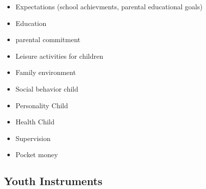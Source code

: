 \documentclass[letterpaper,10pt,openany,onesideH,english]{sphinxmanual}
\begin{document}
\begin{itemize}
\item {} 
Expectations (school achievments, parental educational goals)

\item {} 
Education

\item {} 
parental commitment

\item {} 
Leisure activities for children

\item {} 
Family environment

\item {} 
Social behavior child

\item {} 
Personality Child

\item {} 
Health Child

\item {} 
Supervision

\item {} 
Pocket money

\end{itemize}


\subsection{Youth Instruments}
\label{\detokenize{Contents of SOEPcore/index:youth-instruments}}
\end{document}
